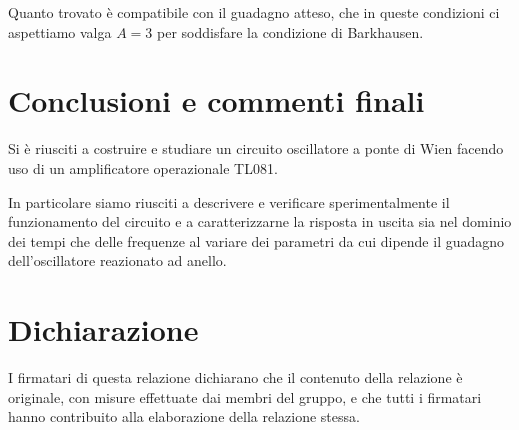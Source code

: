 \documentclass[10pt, a4paper, italian]{article}
\begin{document}
Quanto trovato è compatibile con il guadagno atteso, che in queste condizioni
ci aspettiamo valga $A = 3$ per soddisfare la condizione di Barkhausen.

\section*{Conclusioni e commenti finali}
Si è riusciti a costruire e studiare un circuito oscillatore a ponte di Wien
facendo uso di un amplificatore operazionale TL081.

In particolare siamo riusciti a descrivere e verificare sperimentalmente il
funzionamento del circuito e a caratterizzarne la risposta in uscita sia nel
dominio dei tempi che delle frequenze al variare dei parametri da cui dipende
il guadagno dell'oscillatore reazionato ad anello.

\section*{Dichiarazione}
I firmatari di questa relazione dichiarano che il contenuto della relazione \`e
originale, con misure effettuate dai membri del gruppo, e che tutti i firmatari
hanno contribuito alla elaborazione della relazione stessa.
\end{document}
